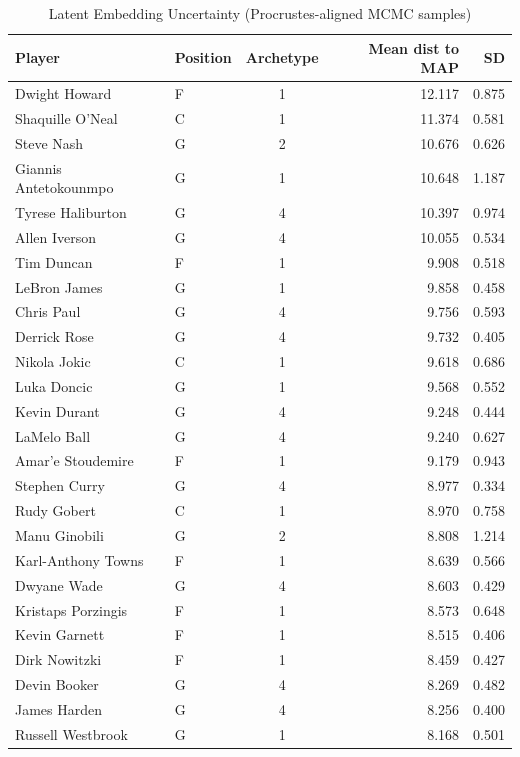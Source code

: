 \begin{table}[t]
\caption*{
{\fontsize{20}{25}\selectfont  Latent Embedding Uncertainty (Procrustes-aligned MCMC samples)\fontsize{12}{15}\selectfont }
} 
\fontsize{12.0pt}{14.0pt}\selectfont
\begin{tabular*}{\linewidth}{@{\extracolsep{\fill}}llcrr}
\toprule
Player & Position & Archetype & Mean dist to MAP & SD \\ 
\midrule\addlinespace[2.5pt]
Dwight Howard & F & 1 & 12.117 & 0.875 \\ 
Shaquille O'Neal & C & 1 & 11.374 & 0.581 \\ 
Steve Nash & G & 2 & 10.676 & 0.626 \\ 
Giannis Antetokounmpo & G & 1 & 10.648 & 1.187 \\ 
Tyrese Haliburton & G & 4 & 10.397 & 0.974 \\ 
Allen Iverson & G & 4 & 10.055 & 0.534 \\ 
Tim Duncan & F & 1 & 9.908 & 0.518 \\ 
LeBron James & G & 1 & 9.858 & 0.458 \\ 
Chris Paul & G & 4 & 9.756 & 0.593 \\ 
Derrick Rose & G & 4 & 9.732 & 0.405 \\ 
Nikola Jokic & C & 1 & 9.618 & 0.686 \\ 
Luka Doncic & G & 1 & 9.568 & 0.552 \\ 
Kevin Durant & G & 4 & 9.248 & 0.444 \\ 
LaMelo Ball & G & 4 & 9.240 & 0.627 \\ 
Amar'e Stoudemire & F & 1 & 9.179 & 0.943 \\ 
Stephen Curry & G & 4 & 8.977 & 0.334 \\ 
Rudy Gobert & C & 1 & 8.970 & 0.758 \\ 
Manu Ginobili & G & 2 & 8.808 & 1.214 \\ 
Karl-Anthony Towns & F & 1 & 8.639 & 0.566 \\ 
Dwyane Wade & G & 4 & 8.603 & 0.429 \\ 
Kristaps Porzingis & F & 1 & 8.573 & 0.648 \\ 
Kevin Garnett & F & 1 & 8.515 & 0.406 \\ 
Dirk Nowitzki & F & 1 & 8.459 & 0.427 \\ 
Devin Booker & G & 4 & 8.269 & 0.482 \\ 
James Harden & G & 4 & 8.256 & 0.400 \\ 
Russell Westbrook & G & 1 & 8.168 & 0.501 \\ 

\end{tabular*}
\end{table}
